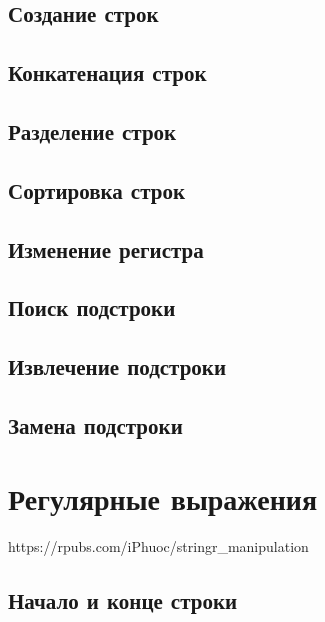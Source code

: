 \documentclass[
  letterpaper,
  DIV=11,
  numbers=noendperiod]{scrreprt}
\theoremstyle{definition}
\theoremstyle{remark}
\begin{document}
\subsection{Создание строк}\label{rstrings-manipulations-creation}

\subsection{Конкатенация строк}\label{rstrings-manipulations-concat}

\subsection{Разделение строк}\label{rstrings-split}

\subsection{Сортировка строк}\label{rstrings-manipulations-sort}

\subsection{Изменение регистра}\label{rstrings-manipulations-case}

\subsection{Поиск подстроки}\label{rstrings-manipulations-detect}

\subsection{Извлечение подстроки}\label{rstrings-manipulations-extract}

\subsection{Замена подстроки}\label{rstrings-manipulations-replace}

\section{Регулярные выражения}\label{rstrings-regex}

https://rpubs.com/iPhuoc/stringr\_manipulation

\subsection{Начало и конце строки}\label{rstrings-regex-startend}
\end{document}
